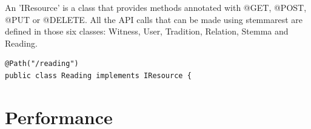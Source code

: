\documentclass[11pt,fleqn,openany]{book} %
\begin{document}
An 'IResource' is a class that provides methods annotated with @GET, @POST, @PUT or @DELETE. All the API calls that can be made using stemmarest are defined in those six classes: Witness, User, Tradition, Relation, Stemma and Reading.
\\

\begin{lstlisting}
@Path("/reading")
public class Reading implements IResource {
\end{lstlisting}



\chapter{Performance}
\end{document}

